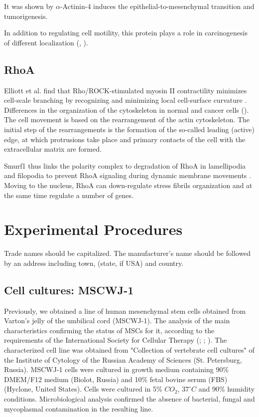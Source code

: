 \documentclass[alpha-refs]{wiley-article}
\begin{document}
It was shown by \cite{an2016alpha} $\alpha$-Actinin-4 induces the epithelial-to-mesenchymal transition and tumorigenesis.

In addition to regulating cell motility, this protein plays a role in carcinogenesis of different localization (\cite{barbolina2008motility}, \cite{hsu2013alpha}).

\subsection*{RhoA}

 Elliott et al. find that Rho/ROCK-stimulated myosin II contractility minimizes cell-scale branching by recognizing and minimizing local cell-surface curvature \cite{elliott2015myosin}.
 Differences in the organization of the cytoskeleton in normal and cancer cells (\cite{shutova2010normal}).
 The cell movement is based on the rearrangement of the actin cytoskeleton. The initial step of the rearrangements is the formation of the so-called leading (active) edge, at which protrusions take place and primary contacts of the cell with the extracellular matrix are formed.

 Smurf1 thus links the polarity complex to degradation of RhoA in lamellipodia and filopodia to prevent RhoA signaling during dynamic membrane movements \cite{wang2003regulation}.
 Moving to the nucleus, RhoA can down-regulate stress fibrils organization and at the same time regulate a number of genes.


\section{Experimental Procedures}

Trade names should be capitalized. The manufacturer's name should be followed by an address including town, (state, if USA) and country.

\subsection{Cell cultures: MSCWJ-1}

Previously, we obtained a line of human mesenchymal stem cells obtained from Varton's jelly of the umbilical cord (MSCWJ-1).
The analysis of the main characteristics confirming the status of MSCs for it, according to the requirements of the International Society for Cellular Therapy (\cite{dominici2006minimal}; \cite{sensebe2010mesenchymal}; \cite{krylova2017derivation}).
The characterized cell line was obtained from "Collection of vertebrate cell cultures" of the Institute of Cytology of the Russian Academy of Sciences (St. Petersburg, Russia).
MSCWJ-1 cells were cultured in growth medium containing 90\% DMEM/F12 medium (Biolot, Russia) and 10\% fetal bovine serum (FBS) (Hyclone, United States).
Cells were cultured in 5\% $CO_2$, $37^{\circ}  C$ and 90\% humidity conditions.
Microbiological analysis confirmed the absence of bacterial, fungal and mycoplasmal contamination in the resulting line.
\end{document}
